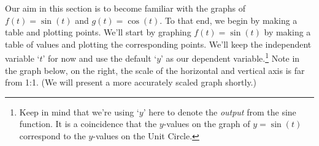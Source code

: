 \documentclass{ximera}
\begin{document}

\smallskip

Our aim in this section is to become familiar with the graphs of $f(t) = \sin(t)$ and $g(t) = \cos(t)$.  To that end, we begin by making a table and plotting points.  We'll start by graphing $f(t) = \sin(t)$ by making a table of values and plotting the corresponding points.  We'll keep the independent variable `$t$' for now and use the default `$y$' as our dependent variable.\footnote{Keep in mind that we're using `$y$' here to denote the \textit{output} from the sine function.  It is a coincidence that the $y$-values on the graph of $y=\sin(t)$ correspond to the $y$-values on the Unit Circle.}  Note in the graph below, on the right,  the scale of the horizontal and vertical axis is far from 1:1.  (We will present a more accurately scaled graph shortly.)
\end{document}
